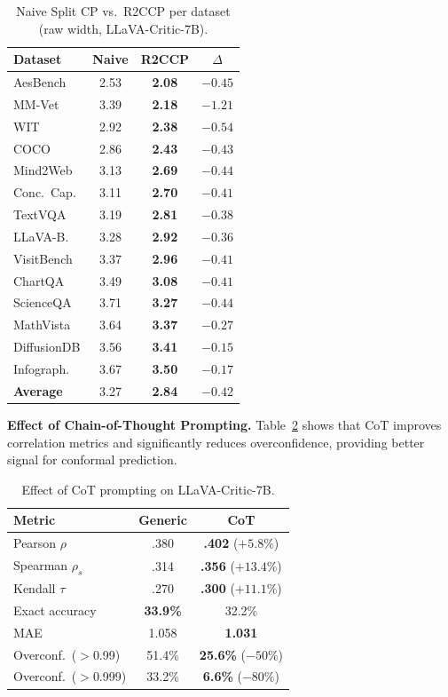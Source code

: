 \documentclass{article}
\begin{document}
\begin{table}[t]
\centering
\caption{Naive Split CP vs.\ R2CCP per dataset (raw width, LLaVA-Critic-7B).}
\label{tab:naive_vs_r2ccp}
\small
\begin{tabular}{lccc}
\toprule
\textbf{Dataset} & \textbf{Naive} & \textbf{R2CCP} & $\Delta$ \\
\midrule
AesBench & 2.53 & \textbf{2.08} & $-0.45$ \\
MM-Vet & 3.39 & \textbf{2.18} & $-1.21$ \\
WIT & 2.92 & \textbf{2.38} & $-0.54$ \\
COCO & 2.86 & \textbf{2.43} & $-0.43$ \\
Mind2Web & 3.13 & \textbf{2.69} & $-0.44$ \\
Conc.\ Cap. & 3.11 & \textbf{2.70} & $-0.41$ \\
TextVQA & 3.19 & \textbf{2.81} & $-0.38$ \\
LLaVA-B. & 3.28 & \textbf{2.92} & $-0.36$ \\
VisitBench & 3.37 & \textbf{2.96} & $-0.41$ \\
ChartQA & 3.49 & \textbf{3.08} & $-0.41$ \\
ScienceQA & 3.71 & \textbf{3.27} & $-0.44$ \\
MathVista & 3.64 & \textbf{3.37} & $-0.27$ \\
DiffusionDB & 3.56 & \textbf{3.41} & $-0.15$ \\
Infograph. & 3.67 & \textbf{3.50} & $-0.17$ \\
\midrule
\textbf{Average} & 3.27 & \textbf{2.84} & $-0.42$ \\
\bottomrule
\end{tabular}
\end{table}

\textbf{Effect of Chain-of-Thought Prompting.}
Table~\ref{tab:cot_effect} shows that CoT improves correlation metrics and significantly reduces overconfidence, providing better signal for conformal prediction.

\begin{table}[t]
\centering
\caption{Effect of CoT prompting on LLaVA-Critic-7B.}
\label{tab:cot_effect}
\small
\begin{tabular}{lcc}
\toprule
\textbf{Metric} & \textbf{Generic} & \textbf{CoT} \\
\midrule
Pearson $\rho$ & .380 & \textbf{.402} ($+5.8\%$) \\
Spearman $\rho_s$ & .314 & \textbf{.356} ($+13.4\%$) \\
Kendall $\tau$ & .270 & \textbf{.300} ($+11.1\%$) \\
Exact accuracy & \textbf{33.9\%} & 32.2\% \\
MAE & 1.058 & \textbf{1.031} \\
\midrule
Overconf.\ ($>$0.99) & 51.4\% & \textbf{25.6\%} ($-50\%$) \\
Overconf.\ ($>$0.999) & 33.2\% & \textbf{6.6\%} ($-80\%$) \\
\bottomrule
\end{tabular}
\end{table}
\end{document}
